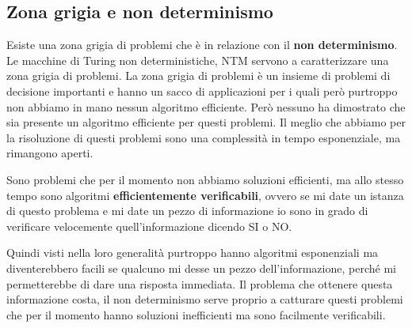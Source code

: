 \documentclass{article}
\begin{document}
\subsection{Zona grigia e non determinismo}
Esiste una zona grigia di problemi che è in relazione con il \textbf{non determinismo}. Le macchine
di Turing non deterministiche, NTM servono a caratterizzare una zona grigia di problemi.
La zona grigia di problemi è un insieme di problemi di decisione importanti e hanno un sacco di applicazioni
per i quali però purtroppo non abbiamo in mano nessun algoritmo efficiente. Però nessuno ha dimostrato
che sia presente un algoritmo efficiente per questi problemi. Il meglio che abbiamo per la risoluzione
di questi problemi sono una complessità in tempo esponenziale, ma rimangono aperti.

Sono problemi che per il momento non abbiamo soluzioni efficienti, ma allo stesso tempo sono algoritmi
\textbf{efficientemente verificabili}, ovvero se mi date un istanza di questo problema e mi date un
pezzo di informazione io sono in grado di verificare velocemente quell'informazione dicendo SI o NO.

Quindi visti nella loro generalità purtroppo hanno algoritmi esponenziali ma diventerebbero facili se
qualcuno mi desse un pezzo dell'informazione, perché mi permetterebbe di dare una risposta immediata.
Il problema che ottenere questa informazione costa, il non determinismo serve proprio a catturare questi
problemi che per il momento hanno soluzioni inefficienti ma sono facilmente verificabili.
\end{document}
